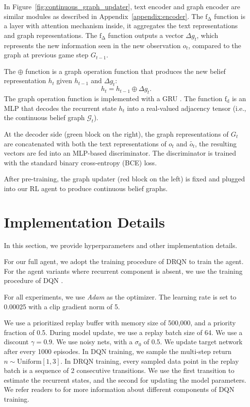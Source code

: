 \documentclass[11pt]{article}
\begin{document}
In Figure~\ref{fig:continuous_graph_updater}, text encoder and graph encoder are similar modules as described in Appendix~\ref{appendix:encoder}. 
The $\mathrm{f_\Delta}$ function is a layer with attention mechanism inside, it aggregates the text representations and graph representations.
The $\mathrm{f_\Delta}$ function outputs a vector $\Delta g_t$, which represents the new information seen in the new observation $o_t$, compared to the graph at previous game step $G_{t-1}$.

The $\oplus$ function is a graph operation function that produces the new belief representation $h_t$ given $h_{t-1}$ and $\Delta g_t$:
\begin{equation}
    h_t = h_{t-1} \oplus \Delta g_t.
\end{equation}
The graph operation function is implemented with a GRU \citep{cho2014gru}.
The function $\mathrm{f_d}$ is an MLP that decodes the recurrent state $h_t$ into a real-valued adjacency tensor (i.e., the continuous belief graph $\mathcal{G}_{t}$).

At the decoder side (green block on the right), the graph representations of $G_t$ are concatenated with both the text representations of $o_t$ and $\tilde{o_t}$, the resulting vectors are fed into an MLP-based discriminator.
The discriminator is trained with the standard binary cross-entropy (BCE) loss.

After pre-training, the graph updater (red block on the left) is fixed and plugged into our RL agent to produce continuous belief graphs.


\section{Implementation Details}
\label{appendix:implementation_details}

In this section, we provide hyperparameters and other implementation details.

For our full agent, we adopt the training procedure of DRQN \citep{hausknecht2015deep,yuan2018counting} to train the agent.
For the agent variants where recurrent component is absent, we use the training procedure of DQN \citep{mnih2013playing}.

For all experiments, we use \emph{Adam} \citep{kingma14adam} as the optimizer.
The learning rate is set to 0.00025 with a clip gradient norm of 5.

We use a prioritized replay buffer with memory size of 500,000, and a priority fraction of 0.5.
During model update, we use a replay batch size of 64.
We use a discount $\gamma = 0.9$.
We use noisy nets, with a $\sigma_0$ of 0.5.
We update target network after every 1000 episodes.
In DQN training, we sample the multi-step return $n \sim \text{Uniform}[1, 3]$.
In DRQN training, every sampled data point in the replay batch is a sequence of 2 consecutive transitions. 
We use the first transition to estimate the recurrent states, and the second for updating the model parameters.
We refer readers to \citet{hessel18rainbow} for more information about different components of DQN training.
\end{document}
